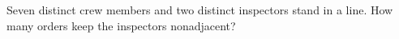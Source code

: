 Seven distinct crew members and two distinct inspectors stand in a line. How many orders keep the inspectors nonadjacent?

